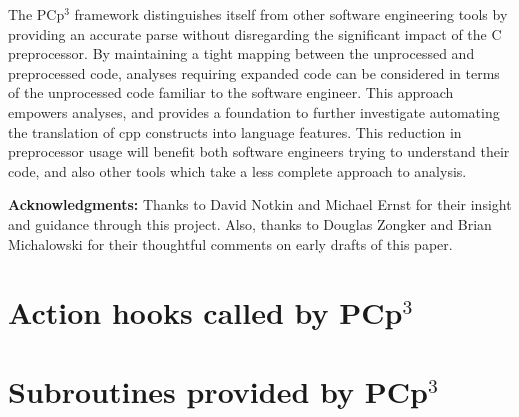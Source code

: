 \documentclass{article}
\newcommand{\pcp}{\mbox{\textsf{PCp}$^3$}}
\newcommand{\Cpp}{\mbox{\textsf{cpp}}}
\newcommand{\C}{\mbox{\textsf{C}}}
\begin{document}
The \pcp{} framework distinguishes itself from other software
engineering tools by providing an accurate parse without disregarding
the significant impact of the \C{} preprocessor.  By maintaining a tight
mapping between the unprocessed and preprocessed code, analyses
requiring expanded code can be considered in terms of the unprocessed
code familiar to the software engineer.  This approach empowers
analyses, and provides a foundation to further investigate automating
the translation of \Cpp{} constructs into language features.  This
reduction in preprocessor usage will benefit both software engineers
trying to understand their code, and also other tools which take a less
complete approach to analysis.

\vspace{1in}
\noindent \textbf{Acknowledgments:}  Thanks to David Notkin and Michael
Ernst for their insight and guidance through this project.  Also, thanks
to Douglas Zongker and Brian Michalowski for their thoughtful comments on
early drafts of this paper.


\appendix
\newpage

\section{Action hooks called by \pcp}
\begin{footnotesize}
\label{sec:hooks}
\begin{itemize}
\sloppy

\fussy
\end{itemize}
\end{footnotesize}

\newpage

\section{Subroutines provided by \pcp}
\label{sec:backcalls}
\begin{footnotesize}
\begin{itemize}
\sloppy

\fussy
\end{itemize}
\end{footnotesize}

\newpage


\nocite{ARM}
\nocite{Dragon}
\nocite{Glickstein97} %
\nocite{Camel}        %
\nocite{Perl}        %
\nocite{Levine92}     %
\nocite{Harbison91}   %
\nocite{Stroustrup97} %
\nocite{Stroustrup94} %
\nocite{Kernighan88}  %
\nocite{Flanagan96}   %
\nocite{EmpCpp}
\nocite{EmpCpp-TR}
\nocite{GCC}
\nocite{CTree}
\nocite{TXL}
\nocite{Cordy92}
\nocite{Bison}
\nocite{Flex}
\nocite{Krone94}
\nocite{Griswold96}
\nocite{Atkinson96}
\nocite{CD2DraftStandard}



\end{document}
